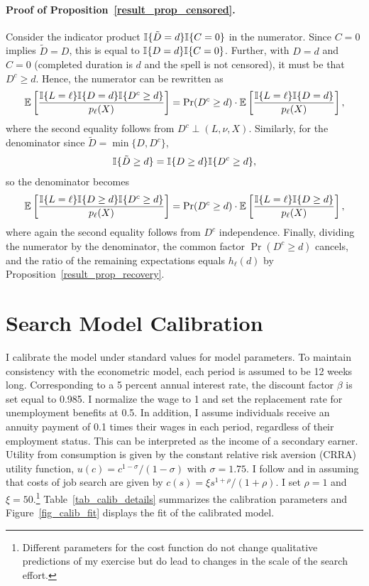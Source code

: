 \documentclass{div}
\begin{document}
\paragraph{Proof of Proposition~\ref{result_prop_censored}.}

Consider the indicator product $\I\{\tilde{D} = d\}\I\{C = 0\}$ in the numerator. Since $C = 0$ implies $\tilde{D} = D$, this is equal to $\I\{D=d\}\I\{C=0\}$. Further, with $D = d$ and $C = 0$ (completed duration is $d$ and the spell is not censored), it must be that $D^c \geq d$. Hence, the numerator can be rewritten as
\[
 \E\left[\frac{\I\{L=\ell\}\I\{D=d\}\I\{D^c \geq d\}}{p_\ell(X)}\right] = \Pr(D^c \geq d) \cdot  \E\left[\frac{\I\{L=\ell\}\I\{D=d\}}{p_\ell(X)}\right],
\]
where the second equality follows from $D^c \perp (L, \nu, X)$. 
Similarly, for the denominator since $\tilde{D} = \min\{D, D^c\} $,
\[
\I\{\tilde{D} \geq d\} = \I\{D \geq d\}\I\{D^c \geq d\},
\]
so the denominator becomes
\[
 \E\left[\frac{\I\{L=\ell\}\I\{D\geq d\}\I\{D^c \geq d\}}{p_\ell(X)}\right] = \Pr(D^c \geq d) \cdot  \E\left[\frac{\I\{L=\ell\}\I\{D\geq d\}}{p_\ell(X)}\right],
\]
where again the second equality follows from $D^c$ independence. Finally, dividing the numerator by the denominator, the common factor $\Pr(D^c \geq d)$ cancels, and the ratio of the remaining expectations equals $h_\ell(d)$ by Proposition~\ref{result_prop_recovery}.


\clearpage
\setcounter{table}{0}
\setcounter{figure}{0}
\section{Search Model Calibration}\label{app_search_model}

I calibrate the model under standard values for model parameters. To maintain consistency with the econometric model, each period is assumed to be 12 weeks long. Corresponding to a 5 percent annual interest rate, the discount factor $\beta$ is set equal to 0.985. I normalize the wage to 1 and set the replacement rate for unemployment benefits at 0.5. In addition, I assume individuals receive an annuity payment of 0.1 times their wages in each period, regardless of their employment status. This can be interpreted as the income of a secondary earner. Utility from consumption is given by the constant relative risk aversion (CRRA) utility function, $u(c) = c^{1-\sigma}/(1-\sigma)$ with $\sigma=1.75$. I follow \cite{DellaVignaEtAl2017} and \cite{MarinescuSkandalis2021} in assuming that costs of job search are given by $ c(s) = \xi s^{1+\rho}/(1+\rho)$. I set $\rho=1$ and $\xi=50$.\footnote{Different parameters for the cost function do not change qualitative predictions of my exercise but do lead to changes in the scale of the search effort.} Table~\ref{tab_calib_details} summarizes the calibration parameters and Figure~\ref{fig_calib_fit} displays the fit of the calibrated model. 
\end{document}
